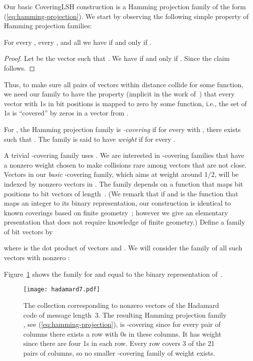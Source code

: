 \documentclass[prodmode,acmtalg]{acmsmall}
\begin{document}
Our basic CoveringLSH construction is a Hamming projection family of the form (\ref{eq:hamming-projection}).
We start by observing the following simple property of Hamming projection families:

\begin{lemma}\label{lem:xor}
For every , every , and all  we have  if and only if .
\end{lemma}
\begin{proof}
Let  be the vector such that .
We have  if and only if . 
Since  the claim follows. 
\end{proof}

Thus, to make sure all pairs of vectors within distance  collide for some function, we need our family to have the property (implicit in the work of~\cite{Arasu_VLDB06}) that every vector with 1s in  bit positions is mapped to zero by some function, i.e., the set of 1s is ``covered'' by zeros in a vector from .

\begin{definition}\label{def:covering}
For , the Hamming projection family  is \emph{-covering} if for every  with , there exists  such that .
The family is said to have \emph{weight}  if  for every .
\end{definition}

A trivial -covering family uses .
We are interested in -covering families that have a nonzero weight chosen to make collisions rare among vectors that are not close.
Vectors in our \emph{basic} -covering family, which aims at weight around 1/2, will be indexed by nonzero vectors in .
The family depends on a function  that maps bit positions to bit vectors of length~. 
(We remark that if  and  is the function that maps an integer to its binary representation, our construction is identical to known coverings based on finite geometry~\cite{gordon1995new}; however we give an elementary presentation that does not require knowledge of finite geometry.)
Define a family of bit vectors  by

where  is the dot product of vectors  and .
We will consider the family of all such vectors with nonzero :

Figure~\ref{fig:hadamard7} shows the family  for  and  equal to the binary representation of~.

\begin{figure}[t]
	\begin{center}
\texttt{[image: hadamard7.pdf]}
\caption{The collection  corresponding to nonzero vectors of the Hadamard code of message length~3. The resulting Hamming projection family  , see (\ref{eq:hamming-projection}), is -covering since for every pair of columns there exists a row with 0s in these columns. It has weight  since there are four 1s in each row.
Every row covers 3 of the 21 pairs of columns, so no smaller -covering family of weight  exists.}\label{fig:hadamard7}
	\end{center}
\end{figure}
\end{document}
